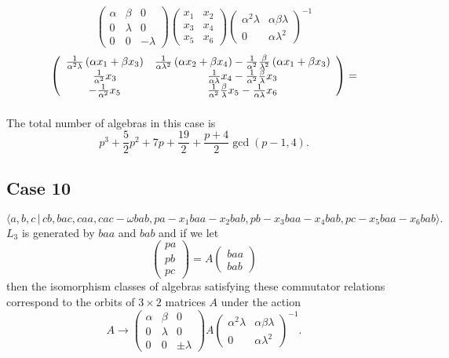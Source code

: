 \documentclass[10pt,thmsa]{article}
\begin{document}
\[
\left( 
\begin{array}{lll}
\alpha & \beta & 0 \\ 
0 & \lambda & 0 \\ 
0 & 0 & -\lambda%
\end{array}%
\right) \left( 
\begin{array}{cc}
x_{1} & x_{2} \\ 
x_{3} & x_{4} \\ 
x_{5} & x_{6}%
\end{array}%
\right) \left( 
\begin{array}{ll}
\alpha ^{2}\lambda & \alpha \beta \lambda \\ 
0 & \alpha \lambda ^{2}%
\end{array}%
\right) ^{-1} 
\]
\[
\left( 
\begin{array}{cc}
\frac{1}{\alpha ^{2}\lambda }\left( \alpha x_{1}+\beta x_{3}\right) & \frac{1%
}{\alpha \lambda ^{2}}\left( \alpha x_{2}+\beta x_{4}\right) -\frac{1}{%
\alpha ^{2}}\frac{\beta }{\lambda ^{2}}\left( \alpha x_{1}+\beta x_{3}\right)
\\ 
\frac{1}{\alpha ^{2}}x_{3} & \frac{1}{\alpha \lambda }x_{4}-\frac{1}{\alpha
^{2}}\frac{\beta }{\lambda }x_{3} \\ 
-\frac{1}{\alpha ^{2}}x_{5} & \frac{1}{\alpha ^{2}}\frac{\beta }{\lambda }%
x_{5}-\frac{1}{\alpha \lambda }x_{6}%
\end{array}%
\right) = 
\]%
$\allowbreak \allowbreak $

The total number of algebras in this case is 
\[
p^3+\frac 52p^2+7p+\frac{19}2+\frac{p+4}2\gcd (p-1,4). 
\]

\subsection{Case 10}

\[
\langle a,b,c\,|\,cb,bac,caa,cac-\omega
bab,pa-x_{1}baa-x_{2}bab,pb-x_{3}baa-x_{4}bab,pc-x_{5}baa-x_{6}bab\rangle . 
\]%
$L_{3}$ is generated by $baa$ and $bab$ and if we let 
\[
\left( 
\begin{array}{l}
pa \\ 
pb \\ 
pc%
\end{array}%
\right) =A\left( 
\begin{array}{l}
baa \\ 
bab%
\end{array}%
\right) 
\]%
then the isomorphism classes of algebras satisfying these commutator
relations correspond to the orbits of $3\times 2$ matrices $A$ under the
action 
\[
A\rightarrow \left( 
\begin{array}{lll}
\alpha & \beta & 0 \\ 
0 & \lambda & 0 \\ 
0 & 0 & \pm \lambda%
\end{array}%
\right) A\left( 
\begin{array}{ll}
\alpha ^{2}\lambda & \alpha \beta \lambda \\ 
0 & \alpha \lambda ^{2}%
\end{array}%
\right) ^{-1}. 
\]
\end{document}
